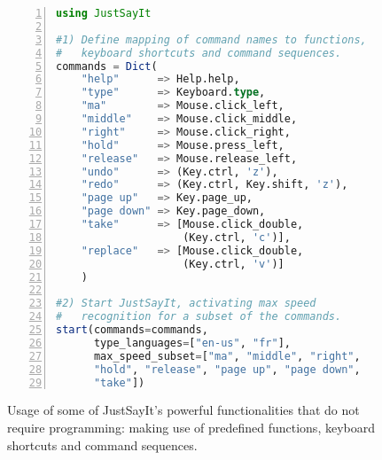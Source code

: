 \documentclass{juliacon}
\begin{document}
\begin{figure}[t]
\begin{lstlisting}[language = Julia, numbers=left, numberstyle=\tiny\color{gray}]
using JustSayIt

#1) Define mapping of command names to functions, 
#   keyboard shortcuts and command sequences.
commands = Dict(
    "help"      => Help.help,
    "type"      => Keyboard.type,
    "ma"        => Mouse.click_left,
    "middle"    => Mouse.click_middle,
    "right"     => Mouse.click_right,
    "hold"      => Mouse.press_left,
    "release"   => Mouse.release_left,
    "undo"      => (Key.ctrl, 'z'),
    "redo"      => (Key.ctrl, Key.shift, 'z'),
    "page up"   => Key.page_up,
    "page down" => Key.page_down,
    "take"      => [Mouse.click_double, 
                    (Key.ctrl, 'c')],
    "replace"   => [Mouse.click_double, 
                    (Key.ctrl, 'v')]
    )

#2) Start JustSayIt, activating max speed 
#   recognition for a subset of the commands.
start(commands=commands, 
      type_languages=["en-us", "fr"], 
      max_speed_subset=["ma", "middle", "right", 
      "hold", "release", "page up", "page down", 
      "take"])
\end{lstlisting}

    \caption{Usage of some of JustSayIt's powerful functionalities that do not require programming: making use of predefined functions, keyboard shortcuts and command sequences.}
	\label{fig:code-noprog}
\end{figure}
\end{document}
